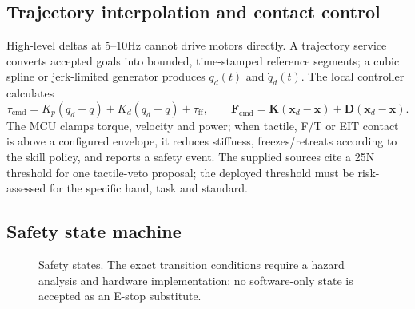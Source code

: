 \documentclass[10pt,a4paper]{article}
\begin{document}
\subsection{Trajectory interpolation and contact control}
High-level deltas at 5--10Hz cannot drive motors directly. A trajectory service converts accepted goals into bounded, time-stamped reference segments; a cubic spline or jerk-limited generator produces $q_d(t)$ and $\dot q_d(t)$. The local controller calculates
\begin{equation}
\tau_{\mathrm{cmd}}=K_p(q_d-q)+K_d(\dot q_d-\dot q)+\tau_{\mathrm{ff}},
\qquad
\mathbf{F}_{\mathrm{cmd}}=\mathbf{K}(\mathbf{x}_d-\mathbf{x})+\mathbf{D}(\dot{\mathbf{x}}_d-\dot{\mathbf{x}}).
\label{eq:impedance}
\end{equation}
The MCU clamps torque, velocity and power; when tactile, F/T or EIT contact is above a configured envelope, it reduces stiffness, freezes/retreats according to the skill policy, and reports a safety event. The supplied sources cite a 25N threshold for one tactile-veto proposal; the deployed threshold must be risk-assessed for the specific hand, task and standard.

\subsection{Safety state machine}
\begin{figure}[ht]
\centering
{}
\caption{Safety states. The exact transition conditions require a hazard analysis and hardware implementation; no software-only state is accepted as an E-stop substitute.}
\label{fig:safety}
\end{figure}
\end{document}
